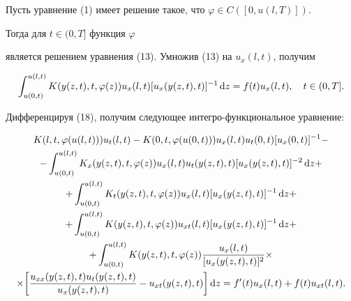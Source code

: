 \begin{pf}


Пусть уравнение (1) имеет решение такое, что $\varphi \in C([0,u(l,T)])$.


Тогда для $t\in (0,T]$ функция $\varphi$


является решением уравнения (13). Умножив (13) на $u_x(l,t)$, получим


\begin{equation}


\int_{u(0,t)}^{u(l,t)}K(y(z,t),t,\varphi


(z))u_x(l,t)[u_x(y(z,t),t)]^{-1}\d z =f(t)u_x(l,t),\q


t\in ( 0,T].




\end{equation}


Дифференцируя (18), получим следующее интегро-функциональное уравнение:


\begin{multline}


\allowdisplaybreaks


K(l,t,\varphi (u(l,t)))u_t(l,t)-K(0,t,\varphi


(u(0,t)))u_x(l,t)u_t(0,t)[u_x(0,t)]^{-1}-\\


- \int_{u(0,t)}^{u(l,t)}K_x(y(z,t),t,\varphi


(z))u_x(l,t)u_t(y(z,t),t) [u_x(y(z,t),t)]^{-2}\d z+\\


+\int_{u(0,t)}^{u(l,t)}K_t(y(z,t),t,\varphi


(z))u_x(l,t)[u_x(y(z,t),t)]^{-1}\d z+ \\


+ \int_{u(0,t)}^{u(l,t)}K(y(z,t),t,\varphi


(z))u_{xt}(l,t)[u_x(y(z,t),t)]^{-1}\d z+\\


+ \int_{u(0,t)}^{u(l,t)}K(y(z,t),t,\varphi


(z)) \frac{u_{x}(l,t)}{[u_x(y(z,t),t)]^2}\times\\


\times \bigg[


\frac{u_{xx}(y(z,t),t)u_t(y(z,t),t)}{u_x(y(z,t),t)}


- u_{xt}(y(z,t),t)\bigg] \d z =


f'(t)u_x(l,t)+f(t)u_{xt}(l,t).




\end{multline}



\end{pf}
